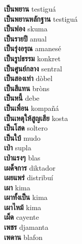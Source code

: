 \textbf{ เป็นพยาน  } testiguá \\
\textbf{ เป็นพยานหลักฐาน  } testiguá \\
\textbf{ เป็นฟอง  } skuma \\
\textbf{ เป็นรายปี  } anual \\
\textbf{ เป็นรุ่งอรุณ  } amanesé \\
\textbf{ เป็นรูปธรรม  } konkret \\
\textbf{ เป็นศูนย์กลาง  } sentral \\
\textbf{ เป็นสองเท่า  } dòbel \\
\textbf{ เป็นสีแทน  } bròns \\
\textbf{ เป็นหนี้  } debe \\
\textbf{ เป็นเพื่อน  } kompañá \\
\textbf{ เป็นเหตุให้สูญเสีย  } kosta \\
\textbf{ เป็นโสด  } soltero \\
\textbf{ เป็นใบ้  } mudo \\
\textbf{ เป่า  } supla \\
\textbf{ เป่าแรงๆ  } blas \\
\textbf{ เผด็จการ  } diktador \\
\textbf{ เผยแพร่  } distribuí \\
\textbf{ เผา  } kima \\
\textbf{ เผาทั้งเป็น  } kima \\
\textbf{ เผาไหม้  } kima \\
\textbf{ เผ็ด  } cayente \\
\textbf{ เพชร  } djamanta \\
\textbf{ เพดาน  } blafon \\
